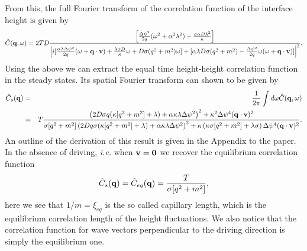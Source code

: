 From this, the full Fourier transform of the correlation function of the interface height is given by
\begin{equation}
\hat C({\bf q},\omega)  = 2TD \frac{\left[ \frac{\Delta\psi^2}{2q}(\omega^2+\alpha^2 \lambda^2) + \frac{\sigma\alpha D\lambda^2}{\kappa}\right]}{\left|i[\frac{\alpha\lambda\Delta\psi^2}{2 q}(\omega + {\bf q}\cdot{\bf v}) + \frac{\lambda \sigma D}{\kappa}\omega + D\sigma(q^2+m^2)\omega]
+[\alpha\lambda D\sigma(q^2+m^2) -\frac{\Delta\psi^2}{2q}\omega(\omega+{\bf q}\cdot{\bf v})]\right|^2}.
\end{equation}
Using the above we can extract the equal time height-height correlation function in the steady states. Its spatial Fourier transform can shown to be given by
\begin{eqnarray}
\tilde C_s({\bf q}) &=& \frac{1}{2\pi} \int d\omega \hat C({\bf q}, \omega)\nonumber\\
&=&T \frac{\left(2 D\sigma q(\kappa[q^2+m^2]+\lambda)+\alpha\kappa\lambda\Delta\psi^2\right)^2 +\kappa^2 \Delta\psi^4 ({\bf q}\cdot{\bf v})^2}{\sigma[q^2+m^2]\left(2D q\sigma (\kappa[q^2+m^2]+\lambda)+\alpha \kappa\lambda \Delta\psi^2\right)^2 + \kappa\left(\kappa\sigma[q^2+m^2] + \lambda\sigma\right)\Delta\psi^4({\bf q}\cdot{\bf v})^2}.\label{eqmaind}
\end{eqnarray}
An outline of the derivation of this result is given in the Appendix to the paper.
In the absence of driving, {\em i.e.} when ${\bf v}={\bf 0}$ we recover the equilibrium correlation function
\begin{equation}
\tilde C_s({\bf q})= \tilde C_{eq}({\bf q})= \frac{T}{\sigma[q^2+m^2]},
\end{equation} 
here we see that  $1/m= \xi_{eq}$ is the so called capillary length, which is the equilibrium correlation length of the height fluctuations. We also notice that the correlation function for wave vectors perpendicular to the driving direction is simply the equilibrium one.

